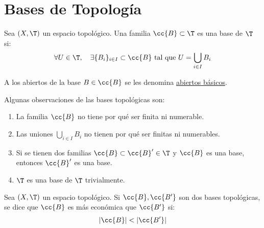 


\section{Bases de Topología}
\begin{definicion}[Base]
    Sea $(X,\T)$ un espacio topológico. Una familia $\cc{B}\subset \T$ es una base de $\T$ si:
    \begin{equation*}
        \forall U\in \T,\quad \exists \{B_i\}_{i\in I}\subset \cc{B} \text{ tal que } U=\bigcup_{i\in I}B_i
    \end{equation*}

    A los abiertos de la base $B\in \cc{B}$ se les denomina \ul{abiertos básicos}.
\end{definicion}

\begin{observacion}
    Algunas observaciones de las bases topológicas son:
    \begin{enumerate}
        \item La familia $\cc{B}$ no tiene por qué ser finita ni numerable.
        \item Las uniones $\bigcup\limits_{i\in I}B_i$ no tienen por qué ser finitas ni numerables.
        \item Si se tienen dos familias $\cc{B}\subset \cc{B}'\in \T$ y $\cc{B}$ es una base, entonces $\cc{B}'$ es una base.
        \item $\T$ es una base de $\T$ trivialmente.
    \end{enumerate}
\end{observacion}

\begin{definicion}
    Sea $(X,\T)$ un espacio topológico. Si $\cc{B},\cc{B'}$ son dos bases topológicas, se dice que $\cc{B}$ es más económica que $\cc{B'}$ si:
    $$|\cc{B}|<|\cc{B'}|$$
\end{definicion}

